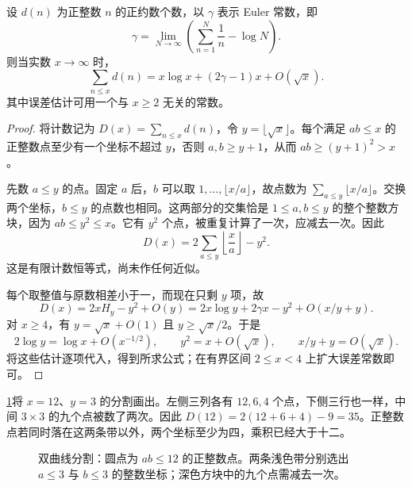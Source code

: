 \begin{proposition}[除数个数的平均值]
\label{b3:prop:25-divisor-average}
设 \(d(n)\) 为正整数 \(n\) 的正约数个数，以 \(\gamma\) 表示 Euler 常数，即
\[
 \gamma=\lim_{N\to\infty}\left(\sum_{n=1}^N\frac1n-\log N\right).
\]
则当实数 \(x\to\infty\) 时，
\[
 \sum_{n\le x}d(n)=x\log x+(2\gamma-1)x+O(\sqrt x).
\]
其中误差估计可用一个与 \(x\ge2\) 无关的常数。
\end{proposition}
\begin{proof}
将计数记为 \(D(x)=\sum_{n\le x}d(n)\)，令 \(y=\lfloor\sqrt x\rfloor\)。每个满足 \(ab\le x\) 的正整数点至少有一个坐标不超过 \(y\)，否则 \(a,b\ge y+1\)，从而 \(ab\ge(y+1)^2>x\)。

先数 \(a\le y\) 的点。固定 \(a\) 后，\(b\) 可以取 \(1,\ldots,\lfloor x/a\rfloor\)，故点数为 \(\sum_{a\le y}\lfloor x/a\rfloor\)。交换两个坐标，\(b\le y\) 的点数也相同。这两部分的交集恰是 \(1\le a,b\le y\) 的整个整数方块，因为 \(ab\le y^2\le x\)。它有 \(y^2\) 个点，被重复计算了一次，应减去一次。因此
\begin{equation}\label{b3:eq:25-hyperbola-count}
 D(x)=2\sum_{a\le y}\left\lfloor\frac xa\right\rfloor-y^2.
\end{equation}
这是有限计数恒等式，尚未作任何近似。

每个取整值与原数相差小于一，而现在只剩 \(y\) 项，故
\[
 D(x)=2xH_y-y^2+O(y)
     =2x\log y+2\gamma x-y^2+O(x/y+y).
\]
对 \(x\ge4\)，有 \(y=\sqrt x+O(1)\) 且 \(y\ge\sqrt x/2\)。于是
\[
 2\log y=\log x+O(x^{-1/2}),\qquad
 y^2=x+O(\sqrt x),\qquad x/y+y=O(\sqrt x).
\]
将这些估计逐项代入，得到所求公式；在有界区间 \(2\le x<4\) 上扩大误差常数即可。
\end{proof}

\cref{b3:fig:25-hyperbola}将 \(x=12\)、\(y=3\) 的分割画出。左侧三列各有 \(12,6,4\) 个点，下侧三行也一样，中间 \(3\times3\) 的九个点被数了两次。因此 \(D(12)=2(12+6+4)-9=35\)。正整数点若同时落在这两条带以外，两个坐标至少为四，乘积已经大于十二。

\begin{figure}[htbp]
\centering
{}
\caption{双曲线分割：圆点为 \(ab\le12\) 的正整数点。两条浅色带分别选出 \(a\le3\) 与 \(b\le3\) 的整数坐标；深色方块中的九个点需减去一次。}
\label{b3:fig:25-hyperbola}
\end{figure}

